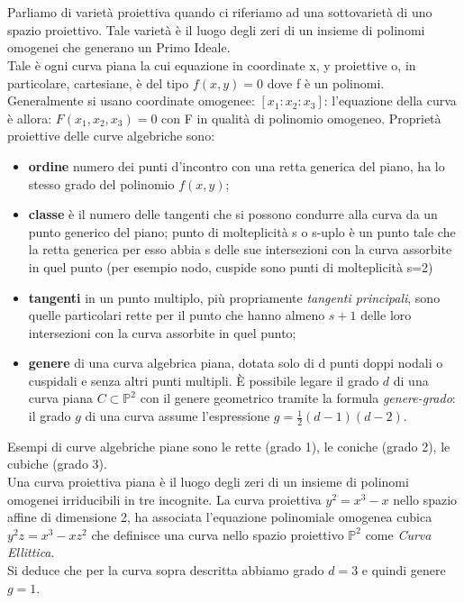 \documentclass[a4paper,12pt]{tesiinfo}
\newcommand\ddfrac[2]{\frac{\displaystyle #1}{\displaystyle #2}}
\begin{document}
%
%
%
\\\\
Parliamo di variet\`a proiettiva quando ci riferiamo ad una sottovariet\`a di uno spazio proiettivo. Tale variet\`a \`e il luogo degli zeri di un insieme di polinomi omogenei che generano un Primo Ideale.
\\
Tale \`e ogni curva piana la cui equazione in coordinate x, y proiettive o, in particolare, cartesiane, \`e del tipo $f (x, y)=0$ dove f \`e un polinomi. Generalmente si usano coordinate omogenee: $[x_1 : x_2 : x_3 ]$: l'equazione della curva \`e allora:   $F(x_1 , x_2 , x_3 )=0$ con F in qualit\`a di polinomio omogeneo.
Propriet\`a proiettive delle curve algebriche sono: 
\begin{itemize}
    \item \textbf{ordine} numero dei punti d'incontro con una retta generica del piano, ha lo stesso grado del polinomio $f (x, y)$; 
    \item \textbf{classe} \`e il numero delle tangenti che si possono condurre alla curva da un punto generico del piano; punto di molteplicit\`a s o s-uplo \`e un punto tale che la retta generica per esso abbia s delle sue intersezioni con la curva assorbite in quel punto (per esempio nodo, cuspide sono punti di molteplicit\`a s=2)
    \item \textbf{tangenti} in un punto multiplo, pi\`u propriamente \textit{tangenti principali}, sono quelle particolari rette per il punto che hanno almeno $s + 1$ delle loro intersezioni con la curva assorbite in quel punto; 
    \item \textbf{genere} di una curva algebrica piana, dotata solo di d punti doppi nodali o cuspidali e senza altri punti multipli. \`E possibile legare il grado $d$ di una curva piana $C \subset \mathbb{P}^2$ con il genere geometrico tramite la formula \textit{genere-grado}: il grado $g$ di una curva assume
    l'espressione $g = \ddfrac{1}{2} (d-1)(d-2)$.
\end{itemize} 
Esempi di curve algebriche piane sono le rette (grado 1), le coniche (grado 2), le cubiche (grado 3).
\\
Una curva proiettiva piana \`e il luogo degli zeri di un insieme di polinomi omogenei irriducibili in tre incognite. La curva proiettiva $y^2 = x^3 -x$ nello spazio affine di dimensione 2, ha associata l'equazione polinomiale omogenea cubica $y^2z = x^3 - xz^2$ che definisce una curva nello spazio proiettivo $\mathbb{P}^2$ come \textit{Curva Ellittica}. 
\\
Si deduce che per la curva sopra descritta abbiamo grado $d = 3$ e quindi genere $g = 1$.
\end{document}

